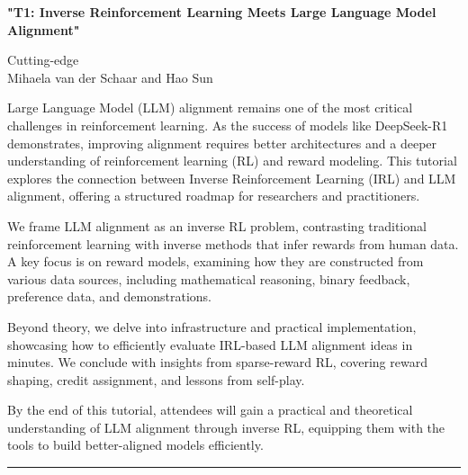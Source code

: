 \begin{center}
    \Large{\textbf{"T1: Inverse Reinforcement Learning Meets Large Language Model Alignment"}\\}
    \par\bigskip
    \large{Cutting-edge}\\
    \large{Mihaela van der Schaar and Hao Sun}\\
    \par\bigskip

\end{center}

Large Language Model (LLM) alignment remains one of the most critical challenges in reinforcement learning. As the success of models like DeepSeek-R1 demonstrates, improving alignment requires better architectures and a deeper understanding of reinforcement learning (RL) and reward modeling. This tutorial explores the connection between Inverse Reinforcement Learning (IRL) and LLM alignment, offering a structured roadmap for researchers and practitioners.

We frame LLM alignment as an inverse RL problem, contrasting traditional reinforcement learning with inverse methods that infer rewards from human data. A key focus is on reward models, examining how they are constructed from various data sources, including mathematical reasoning, binary feedback, preference data, and demonstrations.

Beyond theory, we delve into infrastructure and practical implementation, showcasing how to efficiently evaluate IRL-based LLM alignment ideas in minutes. We conclude with insights from sparse-reward RL, covering reward shaping, credit assignment, and lessons from self-play.

By the end of this tutorial, attendees will gain a practical and theoretical understanding of LLM alignment through inverse RL, equipping them with the tools to build better-aligned models efficiently.

\begin{center}
    \noindent\rule{200px}{1pt}
\end{center}
